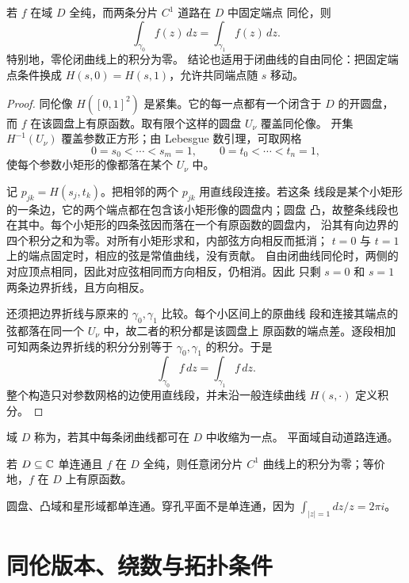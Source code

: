 \begin{theorem}
\label{thm:cauchy-homotopy-invariance}
若 \(f\) 在域 \(D\) 全纯，而两条分片 \(C^1\) 道路在 \(D\) 中固定端点
同伦，则
\[
 \int_{\gamma_0}f(z)\,dz=\int_{\gamma_1}f(z)\,dz.
\]
特别地，零伦闭曲线上的积分为零。
结论也适用于闭曲线的自由同伦：把固定端点条件换成
\(H(s,0)=H(s,1)\)，允许共同端点随 \(s\) 移动。
\end{theorem}

\begin{proof}
同伦像 \(H([0,1]^2)\) 是紧集。它的每一点都有一个闭含于 \(D\) 的开圆盘，
而 \(f\) 在该圆盘上有原函数。取有限个这样的圆盘 \(U_\nu\) 覆盖同伦像。
开集 \(H^{-1}(U_\nu)\) 覆盖参数正方形；由 Lebesgue 数引理，可取网格
\[
 0=s_0<\cdots<s_m=1,\qquad
 0=t_0<\cdots<t_n=1,
\]
使每个参数小矩形的像都落在某个 \(U_\nu\) 中。

记 \(p_{jk}=H(s_j,t_k)\)。把相邻的两个 \(p_{jk}\) 用直线段连接。若这条
线段是某个小矩形的一条边，它的两个端点都在包含该小矩形像的圆盘内；圆盘
凸，故整条线段也在其中。每个小矩形的四条弦因而落在一个有原函数的圆盘内，
沿其有向边界的四个积分之和为零。对所有小矩形求和，内部弦方向相反而抵消；
\(t=0\) 与 \(t=1\) 上的端点固定时，相应的弦是常值曲线，没有贡献。
自由闭曲线同伦时，两侧的对应顶点相同，因此对应弦相同而方向相反，仍相消。因此
只剩 \(s=0\) 和 \(s=1\) 两条边界折线，且方向相反。

还须把边界折线与原来的 \(\gamma_0,\gamma_1\) 比较。每个小区间上的原曲线
段和连接其端点的弦都落在同一个 \(U_\nu\) 中，故二者的积分都是该圆盘上
原函数的端点差。逐段相加可知两条边界折线的积分分别等于
\(\gamma_0,\gamma_1\) 的积分。于是
\[
 \int_{\gamma_0}f\,dz=\int_{\gamma_1}f\,dz .
\]
整个构造只对参数网格的边使用直线段，并未沿一般连续曲线
\(H(s,\cdot)\) 定义积分。
\end{proof}

域 \(D\) 称为，若其中每条闭曲线都可在 \(D\) 中收缩为一点。
平面域自动道路连通。

\begin{corollary}
\label{cor:cauchy-simply-connected}
若 \(D\subseteq\mathbb{C}\) 单连通且 \(f\) 在 \(D\) 全纯，则任意闭分片
\(C^1\) 曲线上的积分为零；等价地，\(f\) 在 \(D\) 上有原函数。
\end{corollary}

圆盘、凸域和星形域都单连通。穿孔平面不是单连通，因为
\(\int_{|z|=1}dz/z=2\pi i\)。

\section{同伦版本、绕数与拓扑条件}

